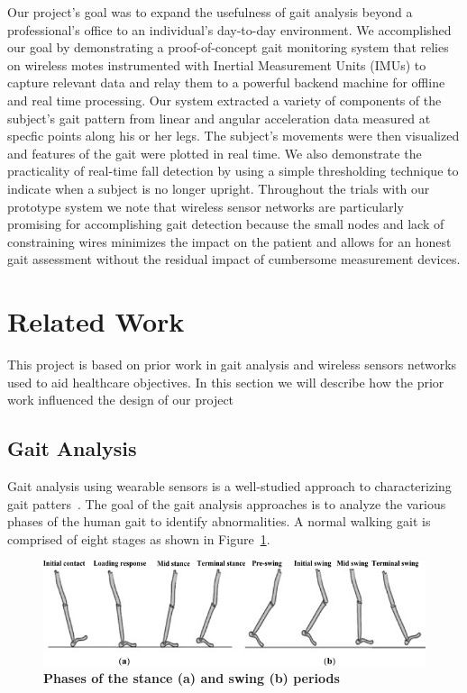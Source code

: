 \documentclass[conference]{IEEEtran}
\begin{document}
Our project's goal was to expand the usefulness of gait analysis beyond a professional’s
office to an individual’s day-to-day environment. We accomplished our goal by
demonstrating a proof-of-concept gait monitoring system that relies on wireless motes
instrumented with Inertial Measurement Units (IMUs) to capture relevant data and relay
them to a powerful backend machine for offline and real time processing. Our system
extracted a variety of components of the subject's gait pattern from linear and angular
acceleration data measured at specfic points along his or her legs. The subject's
movements were then visualized and features of the gait were plotted in real time. We also
demonstrate the practicality of real-time fall detection by using a simple thresholding
technique to indicate when a subject is no longer upright. Throughout the trials with our
prototype system we note that wireless sensor networks are particularly promising for
accomplishing gait detection because the small nodes and lack of constraining wires
minimizes the impact on the patient and allows for an honest gait assessment without the
residual impact of cumbersome measurement devices. 
%
%
\section{Related Work}
This project is based on prior work in gait analysis and wireless sensors networks used to
aid healthcare objectives. In this section we will describe how the prior work influenced
the design of our project 
\subsection{Gait Analysis}
Gait analysis using wearable sensors is a well-studied approach to characterizing gait
patters~\cite{gaits}. The goal of the gait analysis approaches is to analyze the various phases of
the human gait to identify abnormalities. A normal walking gait is comprised of eight
stages as shown in Figure~\ref{fig:phases}. 

\begin{figure}[h]
  \centering
  \includegraphics[width=0.9\columnwidth]{figs/phases}
  \caption{{\bf Phases of the stance (a) and swing (b) periods~\cite{gaits} }}
  \label{fig:phases}
\end{figure}
\end{document}
